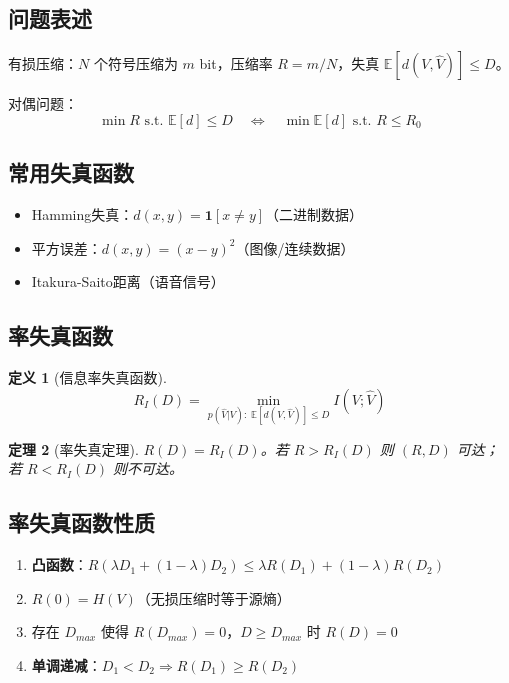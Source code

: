 \documentclass[12pt,a4paper]{ctexart}
\newtheorem{theorem}{定理}[section]
\theoremstyle{definition}
\newtheorem{definition}[theorem]{定义}
\newcommand{\EE}{\mathbb{E}}
\begin{document}
\subsection{问题表述}

有损压缩：$N$ 个符号压缩为 $m$ bit，压缩率 $R = m/N$，失真 $\EE[d(V,\hat{V})] \leq D$。

对偶问题：
\[
\min R \text{ s.t. } \EE[d] \leq D \quad\Longleftrightarrow\quad \min \EE[d] \text{ s.t. } R \leq R_0
\]

\subsection{常用失真函数}

\begin{itemize}[nosep]
  \item Hamming失真：$d(x,y) = \mathbf{1}[x \neq y]$（二进制数据）
  \item 平方误差：$d(x,y) = (x-y)^2$（图像/连续数据）
  \item Itakura-Saito距离（语音信号）
\end{itemize}

\subsection{率失真函数}

\begin{definition}[信息率失真函数]
\[
R_I(D) = \min_{p(\hat{V}|V):\; \EE[d(V,\hat{V})] \leq D} I(V; \hat{V})
\]
\end{definition}

\begin{theorem}[率失真定理]
$R(D) = R_I(D)$。若 $R > R_I(D)$ 则 $(R,D)$ 可达；若 $R < R_I(D)$ 则不可达。
\end{theorem}

\subsection{率失真函数性质}

\begin{keybox}[$R(D)$ 的性质]
\begin{enumerate}[label=(\arabic*),nosep]
  \item \textbf{凸函数}：$R(\lambda D_1 + (1-\lambda)D_2) \leq \lambda R(D_1) + (1-\lambda)R(D_2)$
  \item $R(0) = H(V)$（无损压缩时等于源熵）
  \item 存在 $D_{max}$ 使得 $R(D_{max}) = 0$，$D \geq D_{max}$ 时 $R(D) = 0$
  \item \textbf{单调递减}：$D_1 < D_2 \Rightarrow R(D_1) \geq R(D_2)$
\end{enumerate}
\end{keybox}
\end{document}
